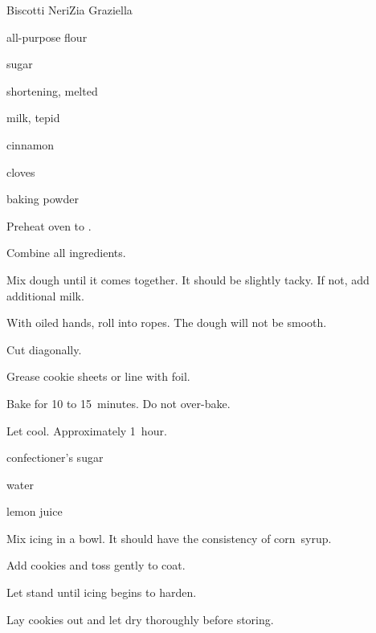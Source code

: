 \begin{recipe}{Biscotti Neri}{Zia Graziella}{}

\begin{ingredients}
\item {} all-purpose flour
\item {} sugar
\item \lbs{\half} shortening, melted
\item {} milk, tepid
\item {} 
\item {} cinnamon
\item {} cloves
\item {} baking powder
\end{ingredients}

\begin{directions}
\item Preheat oven to .
\item Combine all ingredients.
\item Mix dough until it comes together. It should be slightly tacky. If not, add additional milk.
\item With oiled hands, roll into ropes. The dough will not be smooth.
\item Cut diagonally.
\item Grease cookie sheets or line with foil.
\item Bake for 10 to 15~minutes. Do not over-bake.
\item Let cool. Approximately 1~hour.
\end{directions}


\begin{ingredients}
\item confectioner's sugar
\item water
\item lemon juice
\end{ingredients}

\begin{directions}
\item Mix icing in a bowl. It should have the consistency of corn~syrup.
\item Add cookies and toss gently to coat.
\item Let stand until icing begins to harden.
\item Lay cookies out and let dry thoroughly before storing.
\end{directions}

\end{recipe}
